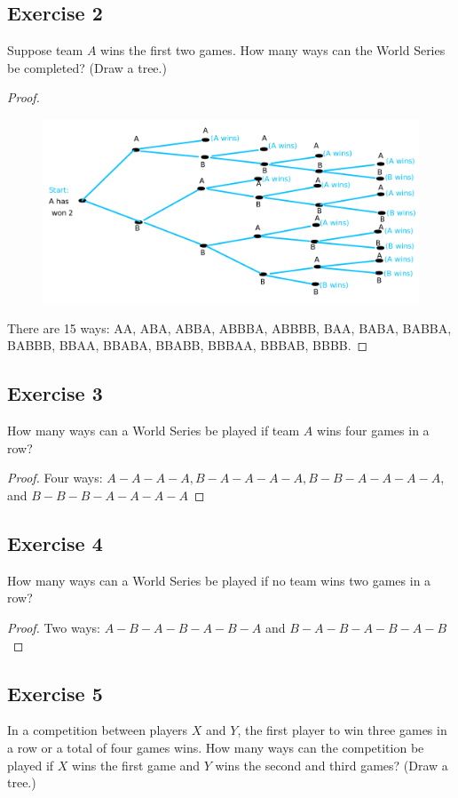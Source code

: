 \documentclass[14pt]{extarticle}
\begin{document}
\subsection{Exercise 2}
Suppose team $A$ wins the first two games. How many ways can the World Series be completed? (Draw a tree.)

\begin{proof}
\begin{figure}[ht!]
\centering
\includegraphics[scale=0.3]{../images/9.2.2.png}
\end{figure}

There are 15 ways: AA, ABA, ABBA, ABBBA, ABBBB, BAA, BABA, BABBA, BABBB, BBAA, BBABA, BBABB, BBBAA, BBBAB, BBBB.
\end{proof}

\subsection{Exercise 3}
How many ways can a World Series be played if team $A$ wins four games in a row?

\begin{proof}
Four ways: \(A-A-A-A, B-A-A-A-A, B-B-A-A-A-A\), and \(B-B-B-A-A-A-A\)
\end{proof}

\subsection{Exercise 4}
How many ways can a World Series be played if no team wins two games in a row?

\begin{proof}
Two ways: \(A-B-A-B-A-B-A\) and \(B-A-B-A-B-A-B\)
\end{proof}

\subsection{Exercise 5}
In a competition between players $X$ and $Y$, the first player to win three games in a row or a total of four games 
wins. How many ways can the competition be played if $X$ wins the first game and $Y$ wins the second and third 
games? (Draw a tree.)
\end{document}
